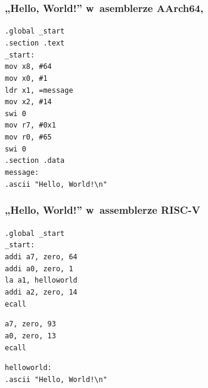 \documentclass[10pt,t]{beamer}
\begin{document}
\begin{frame}
  \frametitle{„Hello, World!” w~asemblerze AArch64,
    \parencite{Low-Level-Learning-You-Can-Learn-AArch64-ETC-Ver-2020}}


  \texttt{.global \_start} \\
  \texttt{.section .text} \\



  \texttt{\_start:} \\[-0.2em]
  \hphantom{aaaaaaaa} \texttt{mov x8, \#64} \\
  \hphantom{aaaaaaaa} \texttt{mov x0, \#1} \\
  \hphantom{aaaaaaaa} \texttt{ldr x1, =message} \\
  \hphantom{aaaaaaaa} \texttt{mov x2, \#14} \\

  \hphantom{aaaaaaaa} \texttt{swi 0} \\

  \hphantom{aaaaaaaa} \texttt{mov r7, \#0x1} \\
  \hphantom{aaaaaaaa} \texttt{mov r0, \#65} \\

  \hphantom{aaaaaaaa} \texttt{swi 0} \\



  \texttt{.section .data} \\
  \texttt{message:} \\
  \hphantom{aaaaaaaa} \texttt{.ascii "Hello, World!\textbackslash n"}

\end{frame}





\begin{frame}
  \frametitle{„Hello, World!” w~assemblerze RISC-V
    \parencite{Low-Level-Learning-You-Can-Learn-RISC-V-ETC-Ver-2021}}


  \texttt{.global \_start} \\
  \texttt{\_start:} \\
  \hphantom{aaaa} \texttt{addi a7, zero, 64} \\
  \hphantom{aaaa} \texttt{addi a0, zero, 1} \\
  \hphantom{aaaa} \texttt{la a1, helloworld} \\
  \hphantom{aaaa} \texttt{addi a2, zero, 14} \\
  \hphantom{aaaa} \texttt{ecall}
  \vspace{0.8em}

  \hphantom{aaaa} \texttt{a7, zero, 93} \\
  \hphantom{aaaa} \texttt{a0, zero, 13} \\
  \hphantom{aaaa} \texttt{ecall}
  \vspace{0.8em}

  \texttt{helloworld:} \\
  \hphantom{aaaa} \texttt{.ascii "Hello, World!\textbackslash n"}

\end{frame}
\end{document}
